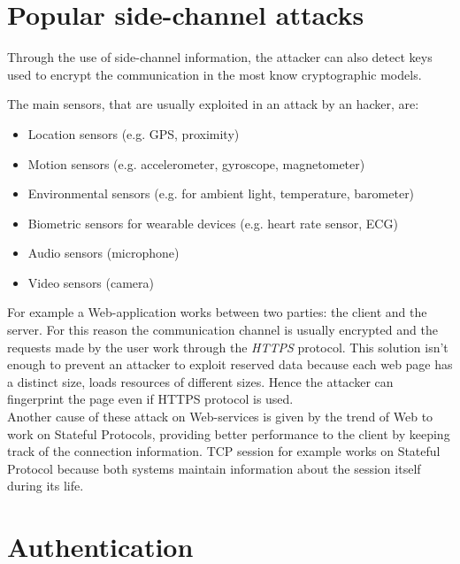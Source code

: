\section{Popular side-channel attacks}
Through the use of side-channel information, the attacker can also detect keys used to encrypt the communication in the most know cryptographic models.
\begin{itemize}
{The main sensors, that are usually exploited in an attack by an hacker, are\cite{}:
\begin{itemize}
\item{Location sensors (e.g. GPS, proximity)}
\item{Motion sensors (e.g. accelerometer, gyroscope, magnetometer)}
\item{Environmental sensors (e.g. for ambient light, temperature, barometer)}
\item{Biometric sensors for wearable devices (e.g. heart rate sensor, ECG)}
\item{Audio sensors (microphone)}
\item{Video sensors (camera)}
\end{itemize}}
\end{itemize}
For example a Web-application works between two parties: the client and the server. For this reason the communication channel is usually encrypted and the requests made by the user work through the \textit{HTTPS} protocol. This solution isn't enough to prevent an attacker to exploit reserved data because each web page has a distinct size, loads resources of different sizes. Hence the attacker can fingerprint the page even if HTTPS protocol is used.\\
Another cause of these attack on Web-services is given by the trend of Web to work on Stateful Protocols, providing better performance to the client by keeping track of the connection information. TCP session for example works on Stateful Protocol because both systems maintain information about the session itself during its life\cite{side_leaks}.\\

\section{Authentication}
